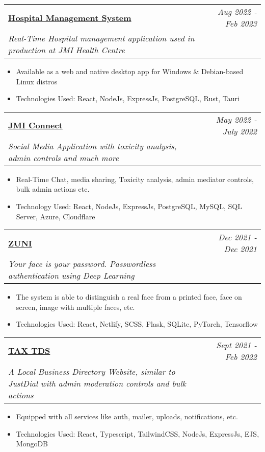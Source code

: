 \documentclass[a4paper,11pt]{article}
\makeatletter
\newcommand{\resumeProject}[4]{
\vspace{0.5mm}\item
    \begin{tabular*}{0.98\textwidth}[t]{l@{\extracolsep{\fill}}r}
        \textbf{#1} & \textit{\footnotesize{#3}} \\
        \footnotesize{\textit{#2}} & \footnotesize{#4}
    \end{tabular*}
    \vspace{-2.4mm}
}
\newcommand{\resumeItemListStart}{\begin{justify}\begin{itemize}[leftmargin=3ex, rightmargin=2ex, noitemsep,labelsep=1.2mm,itemsep=0mm]\small}
\newcommand{\resumeItemListEnd}{\end{itemize}\end{justify}\vspace{-2mm}}
\makeatother
\begin{document}
    \vspace{-2mm}
    
    \resumeProject
      {\href{https://github.com/m3rashid/hmsv2}{Hospital Management System}} %
      {Real-Time Hospital management application used in production at JMI Health Centre}{Aug 2022 - Feb 2023} %
      {} %
      \vspace{-1.2mm}
      \resumeItemListStart
        \item {Available as a web and native desktop app for Windows \& Debian-based Linux distros}
        \item {Technologies Used: React, NodeJs, ExpressJs, PostgreSQL, Rust, Tauri}
    \resumeItemListEnd
    
    \vspace{-2mm}

    \resumeProject
      {{\href{https://github.com/m3rashid/DBMS_Project}{JMI Connect}}} %
      {Social Media Application with toxicity analysis, admin controls and much more}{May 2022 - July 2022} %
      {} %
      \vspace{-1.2mm}
      \resumeItemListStart
        \item {Real-Time Chat, media sharing, Toxicity analysis, admin mediator controls, bulk admin actions etc.}
        \item {Technology Used: React, NodeJs, ExpressJs, PostgreSQL, MySQL, SQL Server, Azure, Cloudflare}
    \resumeItemListEnd
      
    \vspace{-2mm}
    
    \resumeProject
      {\href{https://github.com/sheikhazhanmohammed/ZUNI}{ZUNI}} %
      {Your face is your password. Passwordless authentication using Deep Learning}{Dec 2021 - Dec 2021} %
      {} %
      \vspace{-1.2mm}
      \resumeItemListStart
        \item {The system is able to distinguish a real face from a printed face, face on screen, image with multiple faces, etc.}
        \item {Technologies Used: React, Netlify, SCSS, Flask, SQLite, PyTorch, Tensorflow}
    \resumeItemListEnd

    \vspace{-2mm}
    
    \resumeProject
      {\href{https://github.com/m3rashid/taxtds-new}{TAX TDS}} %
      {A Local Business Directory Website, similar to JustDial with admin moderation controls and bulk actions}{Sept 2021 - Feb 2022} %
      {} %
      \vspace{-1.2mm}
      \resumeItemListStart
        \item {Equipped with all services like auth, mailer, uploads, notifications, etc.}
        \item {Technologies Used: React, Typescript, TailwindCSS, NodeJs, ExpressJs, EJS, MongoDB}
    \resumeItemListEnd
\end{document}
